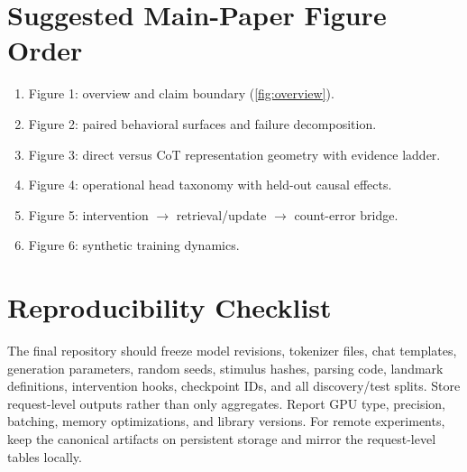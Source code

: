 \documentclass[10pt,twocolumn]{article}
\begin{document}
\section{Suggested Main-Paper Figure Order}
\begin{enumerate}
    \item Figure 1: overview and claim boundary (\cref{fig:overview}).
    \item Figure 2: paired behavioral surfaces and failure decomposition.
    \item Figure 3: direct versus CoT representation geometry with evidence ladder.
    \item Figure 4: operational head taxonomy with held-out causal effects.
    \item Figure 5: intervention $\rightarrow$ retrieval/update $\rightarrow$ count-error bridge.
    \item Figure 6: synthetic training dynamics.
\end{enumerate}

\section{Reproducibility Checklist}
The final repository should freeze model revisions, tokenizer files, chat templates, generation
parameters, random seeds, stimulus hashes, parsing code, landmark definitions, intervention hooks,
checkpoint IDs, and all discovery/test splits. Store request-level outputs rather than only
aggregates. Report GPU type, precision, batching, memory optimizations, and library versions.
For remote experiments, keep the canonical artifacts on persistent storage and mirror the
request-level tables locally.
\end{document}
